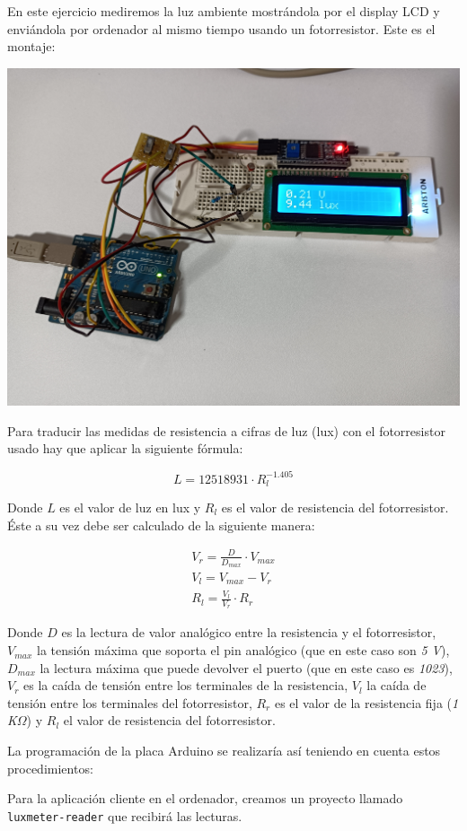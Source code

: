 En este ejercicio mediremos la luz ambiente mostrándola por el display LCD y
enviándola por ordenador al mismo tiempo usando un fotorresistor. Este es el
montaje:

\includegraphics[width=\linewidth]{luxmeter-reader-wiring.jpg}

Para traducir las medidas de resistencia a cifras de luz (lux) con el
fotorresistor usado hay que aplicar la siguiente fórmula:

\begin{equation*}
L = 12518931 \cdot R_l^{-1.405}
\end{equation*}

Donde $L$ es el valor de luz en lux y $R_l$ es el valor de resistencia del
fotorresistor. Éste a su vez debe ser calculado de la siguiente manera:

\begin{gather*}
V_r = \frac{D}{D_{max}} \cdot V_{max} \\
V_l = V_{max} - V_r \\
R_l = \frac{V_l}{V_r} \cdot R_r
\end{gather*}

Donde $D$ es la lectura de valor analógico entre la resistencia y el
fotorresistor, $V_{max}$ la tensión máxima que soporta el pin analógico (que en
este caso son \emph{5 V}), $D_{max}$ la lectura máxima que puede devolver el
puerto (que en este caso es \emph{1023}), $V_r$ es la caída de tensión entre
los terminales de la resistencia, $V_l$ la caída de tensión entre los
terminales del fotorresistor, $R_r$ es el valor de la resistencia fija
(\emph{1 K$\Omega$}) y $R_l$ el valor de resistencia del fotorresistor.

La programación de la placa Arduino se realizaría así teniendo en cuenta estos
procedimientos:



Para la aplicación cliente en el ordenador, creamos un proyecto llamado
\verb|luxmeter-reader| que recibirá las lecturas.



